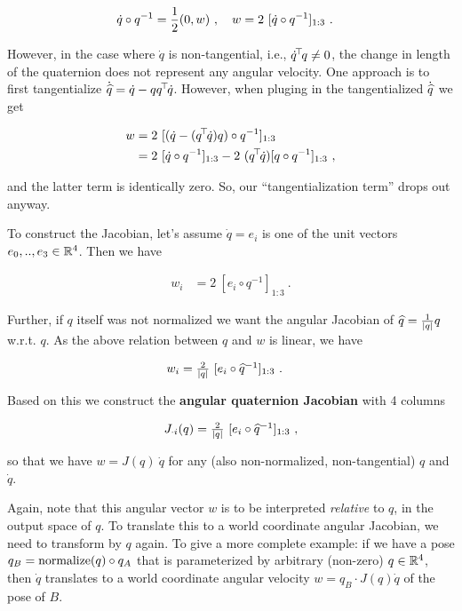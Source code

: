 $$\begin{align}
\dot q \circ q^{-1}
&= \frac{1}{2} (0,w) ~,\quad w = 2~ [\dot q \circ q^{-1}]_{1:3} ~.
\end{align}$$

However, in the case where $\dot q$ is non-tangential, i.e., $\dot q^{\!\top\!} q \not=0$,
the change in length of the quaternion does not represent any angular
velocity. One approach is to first tangentialize
$\dot {\widehat q} = \dot q - q q^{\!\top\!} \dot q$.
However, when pluging in the tangentialized
$\dot{\widehat q}$ we get

$$\begin{align}
w
&= 2~ [(\dot q - (q^{\!\top\!} \dot q) q)  \circ q^{-1}]_{1:3} \\
&= 2~ [\dot q \circ q^{-1}]_{1:3} - 2~ (q^{\!\top\!} \dot q) [q \circ q^{-1}]_{1:3} ~,
\end{align}$$

and the latter term is identically zero. So, our ``tangentialization term'' drops out anyway.

To construct the Jacobian, let's assume $\dot q=e_i$ is one of the unit vectors
$e_0,..,e_3\in{\mathbb{R}}^4$. Then we have

$$\begin{align}
w_i
&= 2~ [e_i\circ q^{-1}]_{1:3} ~.
\end{align}$$

Further, if $q$ itself was not normalized we want the angular Jacobian
of $\widehat q = \textstyle\frac1{|q|} q$ w.r.t. $q$. As the above relation between $q$
and $w$ is linear, we have

$$\begin{align}
w_i
&= \textstyle\frac2{|q|}~ [e_i \circ \widehat q^{-1}]_{1:3} ~.
\end{align}$$

Based on this we construct the \textbf{angular quaternion Jacobian}
with 4 columns

$$\begin{align}
J_{\cdot i}(q) = \textstyle\frac2{|q|}~ [e_i \circ \widehat q^{-1}]_{1:3} ~,
\end{align}$$

so that we have $w = J(q)~ \dot q$ for any (also non-normalized, non-tangential) $q$
and $\dot q$.

Again, note that this angular vector $w$ is to be
interpreted \emph{relative} to $q$, in the output space of $q$. To
translate this to a world coordinate angular Jacobian, we need to
transform by $q$ again. To give a more complete example: if we have a
pose $q_B = \text{normalize}(q) \circ q_A$ that is parameterized by arbitrary (non-zero)
$q\in{\mathbb{R}}^4$, then $\dot
q$ translates to a world coordinate angular velocity $w = q_B \cdot
J(q) \dot q$ of the pose of $B$.


